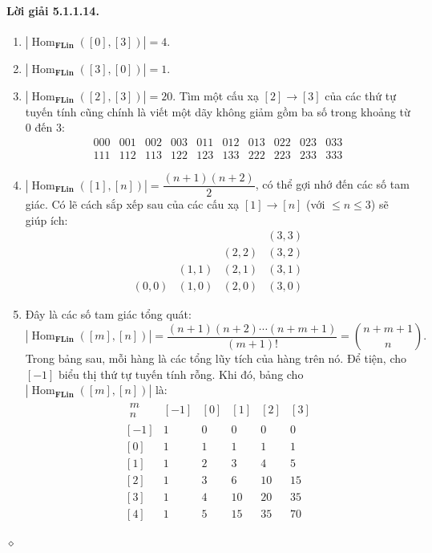 \paragraph{Lời giải 5.1.1.14.}
\begin{enumerate}[label=\alph*.]
\item $|\operatorname{Hom}_{\mathbf{FLin}}([0],[3])|=4$.
\item $|\operatorname{Hom}_{\mathbf{FLin}}([3],[0])|=1$.
\item $|\operatorname{Hom}_{\mathbf{FLin}}([2],[3])|=20$. Tìm một cấu xạ $[2]\to[3]$ của các thứ tự tuyến tính cũng chính là viết một dãy không giảm gồm ba số trong khoảng từ 0 đến 3:
\[\begin{array}{rrrrrrrrrr}
000&001&002&003&011&012&013&022&023&033\\
111&112&113&122&123&133&222&223&233&333
\end{array}\]
\item $|\operatorname{Hom}_{\mathbf{FLin}}([1],[n])|=\dfrac{(n+1)(n+2)}2$, có thể gợi nhớ đến các số tam giác. Có lẽ cách sắp xếp sau của các cấu xạ $[1]\to[n]$ (với $\leq n\leq3$) sẽ giúp ích:
\[\begin{array}{rrrr}
&&&(3,3)\\[4pt]
&&(2,2)&(3,2)\\[4pt]
&(1,1)&(2,1)&(3,1)\\[4pt]
(0,0)&(1,0)&(2,0)&(3,0)
\end{array}\]

\item Đây là các số tam giác tổng quát:
\[|\operatorname{Hom}_{\mathbf{FLin}}([m],[n])|=\frac{(n+1)(n+2)\cdots(n+m+1)}{(m+1)!}=\binom{n+m+1}{n}.\]
Trong bảng sau, mỗi hàng là các tổng lũy tích của hàng trên nó. Để tiện, cho $[-1]$ biểu thị thứ tự tuyến tính rỗng. Khi đó, bảng cho $|\operatorname{Hom}_{\mathbf{FLin}}([m],[n])|$ là:
\[\begin{array}{r||rrrrr}
\begin{matrix}m\\[-2pt] n\end{matrix}&[-1]&[0]&[1]&[2]&[3]\\\hline
{[-1]}&1&0&0&0&0\\
{[0]}&1&1&1&1&1\\
{[1]}&1&2&3&4&5\\
{[2]}&1&3&6&10&15\\
{[3]}&1&4&10&20&35\\
{[4]}&1&5&15&35&70
\end{array}\]
\end{enumerate}\hfill$\diamond$

